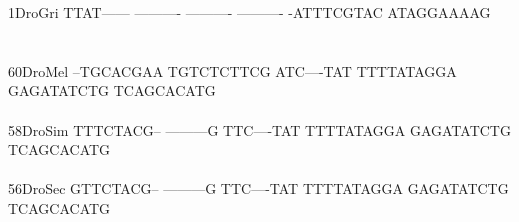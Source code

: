 \documentclass[11pt,twoside,reqno,a4paper]{article}
\begin{document}
{1\hspace*{4\charwidth}DroGri	TTAT------	----------	----------	----------	-ATTTCGTAC	ATAGGAAAAG	\\
\hspace*{5\charwidth}\hspace*{7\charwidth}\hspace*{1\charwidth}\hspace*{1\charwidth}\hspace*{1\charwidth}\hspace*{1\charwidth}\hspace*{1\charwidth}\hspace*{1\charwidth}\\
\\
60\hspace*{3\charwidth}DroMel	--TGCACGAA	TGTCTCTTCG	ATC----TAT	TTTTATAGGA	GAGATATCTG	TCAGCACATG	\\
\hspace*{5\charwidth}\hspace*{7\charwidth}\hspace*{1\charwidth}\hspace*{1\charwidth}\hspace*{1\charwidth}\hspace*{1\charwidth}\hspace*{1\charwidth}\hspace*{1\charwidth}\\
58\hspace*{3\charwidth}DroSim	TTTCTACG--	---------G	TTC----TAT	TTTTATAGGA	GAGATATCTG	TCAGCACATG	\\
\hspace*{5\charwidth}\hspace*{7\charwidth}\hspace*{1\charwidth}\hspace*{1\charwidth}\hspace*{1\charwidth}\hspace*{1\charwidth}\hspace*{1\charwidth}\hspace*{1\charwidth}\\
56\hspace*{3\charwidth}DroSec	GTTCTACG--	---------G	TTC----TAT	TTTTATAGGA	GAGATATCTG	TCAGCACATG	\\
\hspace*{5\charwidth}\hspace*{7\charwidth}\hspace*{1\charwidth}\hspace*{1\charwidth}\hspace*{1\charwidth}\hspace*{1\charwidth}\hspace*{1\charwidth}\hspace*{1\charwidth}\\
}
\end{document}
